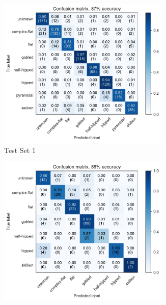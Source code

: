 

\begin{figure}[ht]
    \centering
    \begin{subfigure}[t]{0.45\columnwidth}
        \centering
        \includegraphics[width=0.90\textwidth]{chapter_4_roofshape/imgs/allclasses_combined_dual.pdf}
        \caption{Test Set     1}
        \label{fig:ch1_dual_test_combined_cm}
    \end{subfigure}
    \hfill
    \begin{subfigure}[t]{0.45\columnwidth}
        \centering
        \includegraphics[width=0.90\textwidth]{chapter_4_roofshape/imgs/allclasses_aa_annarbor_dual.pdf}

\end{subfigure}
\end{figure}

